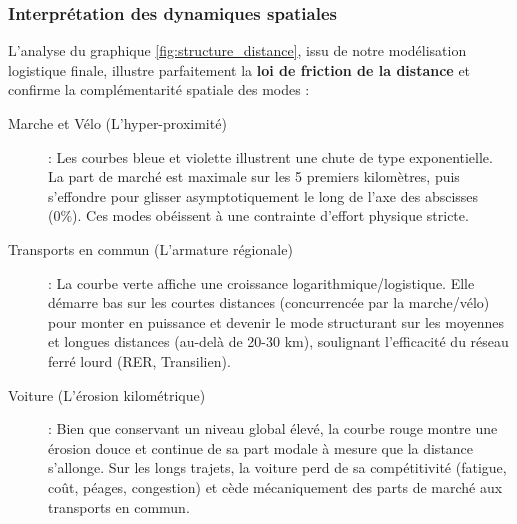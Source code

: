 \documentclass[11pt,a4paper]{article}
\begin{document}
\subsubsection{Interprétation des dynamiques spatiales}
L'analyse du graphique \ref{fig:structure_distance}, issu de notre modélisation logistique finale, illustre parfaitement la \textbf{loi de friction de la distance} et confirme la complémentarité spatiale des modes :
\begin{description}
    \item[Marche et Vélo (L'hyper-proximité)] : Les courbes bleue et violette illustrent une chute de type exponentielle. La part de marché est maximale sur les 5 premiers kilomètres, puis s'effondre pour glisser asymptotiquement le long de l'axe des abscisses (0\%). Ces modes obéissent à une contrainte d'effort physique stricte.
    \item[Transports en commun (L'armature régionale)] : La courbe verte affiche une croissance logarithmique/logistique. Elle démarre bas sur les courtes distances (concurrencée par la marche/vélo) pour monter en puissance et devenir le mode structurant sur les moyennes et longues distances (au-delà de 20-30 km), soulignant l'efficacité du réseau ferré lourd (RER, Transilien).
    \item[Voiture (L'érosion kilométrique)] : Bien que conservant un niveau global élevé, la courbe rouge montre une érosion douce et continue de sa part modale à mesure que la distance s'allonge. Sur les longs trajets, la voiture perd de sa compétitivité (fatigue, coût, péages, congestion) et cède mécaniquement des parts de marché aux transports en commun.
\end{description}
\end{document}
